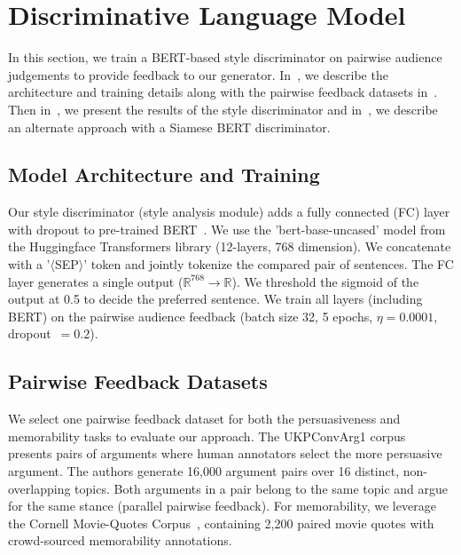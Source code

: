 \section{Discriminative Language Model}
\label{sec_discriminator}

In this section, we train a BERT-based style discriminator on pairwise audience judgements to provide feedback to our generator. In~, we describe the architecture and training details along with the pairwise feedback datasets in~. Then in~, we present the results of the style discriminator and in~, we describe an alternate approach with a Siamese BERT discriminator.

\subsection{Model Architecture and Training}
\label{subsec:discrim_arch}

Our style discriminator (style analysis module) adds a fully connected (FC) layer with dropout to pre-trained BERT~\citep{devlin-etal-2019-bert}. We use the 'bert-base-uncased' model from the Huggingface Transformers library \citep{wolf2019} (12-layers, 768 dimension). We concatenate with a '$\langle$SEP$\rangle$' token and jointly tokenize the compared pair of sentences. The FC layer generates a single output ($\mathbb{R}^{768} \rightarrow \mathbb{R}$). We threshold the sigmoid of the output at 0.5 to decide the preferred sentence. We train all layers (including BERT) on the pairwise audience feedback (batch size 32, 5 epochs, $\eta=0.0001$, dropout~$=0.2$). 

\subsection{Pairwise Feedback Datasets}
\label{subsection:pairwise_datasets}
We select one pairwise feedback dataset for both the persuasiveness and memorability tasks to evaluate our approach. The UKPConvArg1 corpus~\citep{habernal-gurevych-2016-argument} presents pairs of arguments where human annotators select the more persuasive argument. The authors generate 16,000 argument pairs over 16 distinct, non-overlapping topics. Both arguments in a pair belong to the same topic and argue for the same stance (\ie parallel pairwise feedback). For memorability, we leverage the Cornell Movie-Quotes Corpus~\citep{danescu-niculescu-mizil-etal-2012-hello}, containing 2,200 paired movie quotes with crowd-sourced memorability annotations. 

